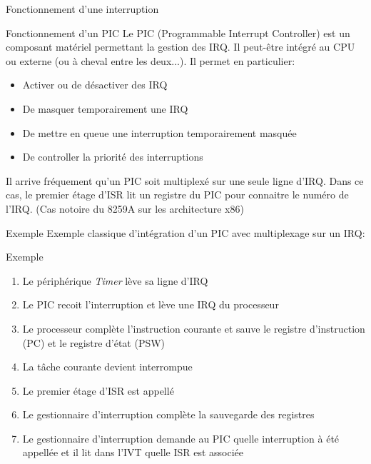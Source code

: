 \begin{frame}[fragile]{Fonctionnement d'une interruption} 
  \begin{center}
  \end{center}
\end{frame}  

\begin{frame}{Fonctionnement d'un PIC}
  Le PIC (Programmable Interrupt Controller) est un composant matériel
  permettant  la gestion  des  IRQ.  Il peut-être  intégré  au CPU  ou
  externe (ou à cheval entre les deux...). Il permet en particulier:
  \begin{itemize}
  \item Activer ou de désactiver des IRQ
  \item De masquer temporairement une IRQ
  \item De mettre en queue une interruption temporairement masquée
  \item De controller la priorité des interruptions
  \end{itemize} 
  Il arrive fréquement  qu'un PIC soit multiplexé sur  une seule ligne
  d'IRQ. Dans  ce cas, le premier  étage d'ISR lit un  registre du PIC
  pour connaitre  le numéro de l'IRQ.   (Cas notoire du  8259A sur les
  architecture x86)

\end{frame} 

\begin{frame}{Exemple}
  Exemple classique d'intégration d'un PIC avec multiplexage sur un IRQ:
  \begin{center}
  \end{center}
\end{frame} 

\begin{frame}{Exemple}
  \begin{enumerate}
  \item Le périphérique \emph{Timer} lève sa ligne d'IRQ
  \item Le PIC recoit l'interruption et lève une IRQ du processeur
  \item  Le processeur  complète  l'instruction courante  et sauve  le
    registre d'instruction (PC) et le registre d'état (PSW)
  \item La tâche courante devient interrompue
  \item Le premier étage d'ISR est appellé
  \item  Le  gestionnaire d'interruption  complète  la sauvegarde  des
    registres
  \item   Le  gestionnaire  d'interruption   demande  au   PIC  quelle
    interruption à  été appellée et il  lit dans l'IVT  quelle ISR est
    associée
  \end{enumerate}
\end{frame}

